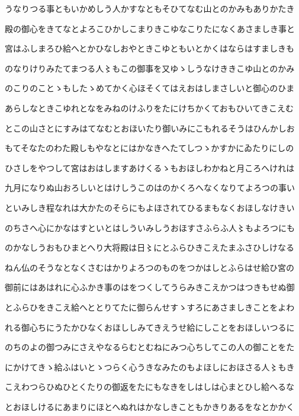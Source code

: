 \documentclass[a4paper,11pt,landscape]{ltjtarticle}
\begin{document}
\par\medskip
うなりつる事ともいかめしう人かすなともそひてなむ山とのかみもありかたき
\par\medskip
殿の御心をきてなとよろこひかしこまりきこゆなこりたになくあさましき事と
\par\medskip
宮はふしまろひ給へとかひなしおやときこゆともいとかくはならはすましきも
\par\medskip
のなりけりみたてまつる人〻もこの御事を又ゆゝしうなけききこゆ山とのかみ
\par\medskip
のこりのことゝもしたゝめてかく心ほそくてはえおはしまさしいと御心のひま
\par\medskip
あらしなときこゆれとなをみねのけふりをたにけちかくておもひいてきこえむ
\par\medskip
とこの山さとにすみはてなむとおほいたり御いみにこもれるそうはひんかしお
\par\medskip
もてそなたのわた殿しもやなとにはかなきへたてしつゝかすかにゐたりにしの
\par\medskip
ひさしをやつして宮はおはしますあけくるゝもおほしわかねと月ころへけれは
\par\medskip
九月になりぬ山おろしいとはけしうこのはのかくろへなくなりてよろつの事い
\par\medskip
といみしき程なれは大かたのそらにもよほされてひるまもなくおほしなけきい
\par\medskip
のちさへ心にかなはすといとはしういみしうおほすさふらふ人〻もよろつにも
\par\medskip
のかなしうおもひまとへり大将殿は日〻にとふらひきこえたまふさひしけなる
\par\medskip
ねん仏のそうなとなくさむはかりよろつのものをつかはしとふらはせ給ひ宮の
\par\medskip
御前にはあはれに心ふかき事のはをつくしてうらみきこえかつはつきもせぬ御
\par\medskip
とふらひをきこえ給へととりてたに御らんせすゝすろにあさましきことをよわ
\par\medskip
れる御心ちにうたかひなくおほししみてきえうせ給にしことをおほしいつるに
\par\medskip
のちのよの御つみにさえやなるらむとむねにみつ心ちしてこの人の御ことをた
\par\medskip
にかけてきゝ給ふはいとゝつらく心うきなみたのもよほしにおほさる人〻もき
\par\medskip
こえわつらひぬひとくたりの御返をたにもなきをしはしは心まとひし給へるな
\par\medskip
とおほしけるにあまりにほとへぬれはかなしきこともかきりあるをなとかかく
\end{document}
